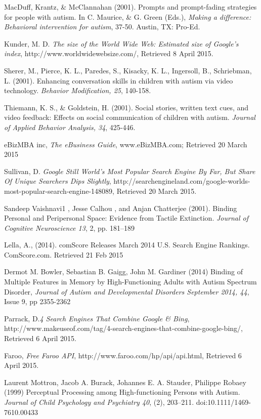 \documentclass[a4paper, 10pt]{article}
\begin{document}
\begin{thebibliography}{100}
 MacDuff, Krantz, \& McClannahan (2001). Prompts and prompt-fading strategies for people with autism. In C. Maurice, \& G. Green (Eds.), \textit{Making a difference: Behavioral intervention for autism}, 37-50. Austin, TX: Pro-Ed.

 Kunder, M. D. \textit{The size of the World Wide Web: Estimated size of Google's index}, http://www.worldwidewebsize.com/, Retrieved 8 April 2015.


Sherer, M., Pierce, K. L., Paredes, S., Kisacky, K. L., Ingersoll, B., Schriebman, L. (2001). Enhancing conversation skills in children with autism via video technology. \textit{Behavior Modification, 25}, 140-158.


Thiemann, K. S., \& Goldstein, H. (2001). Social stories, written text cues, and video feedback: Effects on social communication of children with autism. \textit{Journal of Applied Behavior Analysis, 34}, 425-446.

eBizMBA inc, \textit{The eBusiness Guide}, www.eBizMBA.com; Retrieved 20 March 2015

Sullivan, D. \textit{Google Still World’s Most Popular Search Engine By Far, But Share Of Unique Searchers Dips Slightly},  http://searchengineland.com/google-worlds-most-popular-search-engine-148089, Retrieved 20 March 2015.  

Sandeep Vaishnavi1 , Jesse Calhou , and Anjan Chatterjee (2001). Binding Personal and Peripersonal Space: Evidence from Tactile Extinction. \textit{Journal of Cognitive Neuroscience 13}, 2, pp. 181–189

Lella, A., (2014). comScore Releases March 2014 U.S. Search Engine Rankings. ComScore.com. Retrieved 21 Feb 2015

Dermot M. Bowler, Sebastian B. Gaigg, John M. Gardiner (2014) Binding of Multiple Features in Memory by High-Functioning Adults with Autism Spectrum Disorder, \textit{Journal of Autism and Developmental Disorders September 2014, 44}, Issue 9, pp 2355-2362

 Parrack, D.\textit{4 Search Engines That Combine Google \& Bing}, http://www.makeuseof.com/tag/4-search-engines-that-combine-google-bing/, Retrieved 6 April 2015.


Faroo, \textit{Free Faroo API}, http://www.faroo.com/hp/api/api.html, Retrieved 6 April 2015.

 Laurent Mottron, Jacob A. Burack, Johannes E. A. Stauder, Philippe Robaey (1999) Perceptual Processing among High-functioning Persons with Autism. \textit{Journal of Child Psychology and Psychiatry 40}, (2), 203–211. doi:10.1111/1469-7610.00433

\end{thebibliography}
\end{document}
